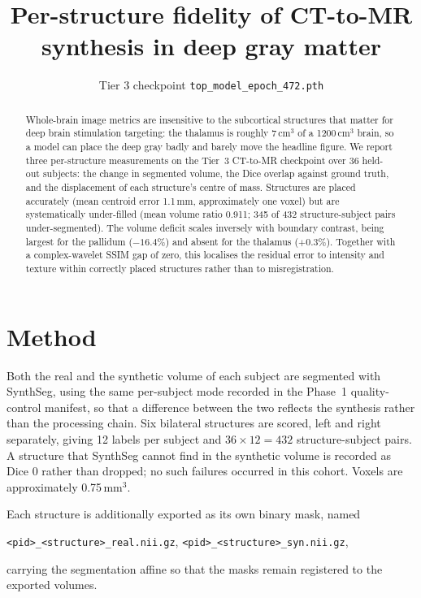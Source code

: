 \documentclass[11pt]{article}
\title{Per-structure fidelity of CT-to-MR synthesis in deep gray matter}
\author{Tier 3 checkpoint \texttt{top\_model\_epoch\_472.pth}}
\date{}
\begin{document}
\maketitle

\begin{abstract}
\noindent
Whole-brain image metrics are insensitive to the subcortical structures that
matter for deep brain stimulation targeting: the thalamus is roughly
7\,cm$^3$ of a 1200\,cm$^3$ brain, so a model can place the deep gray badly and
barely move the headline figure. We report three per-structure measurements on
the Tier~3 CT-to-MR checkpoint over 36 held-out subjects: the change in
segmented volume, the Dice overlap against ground truth, and the displacement of
each structure's centre of mass. Structures are placed accurately (mean centroid
error 1.1\,mm, approximately one voxel) but are systematically under-filled
(mean volume ratio 0.911; 345 of 432 structure-subject pairs under-segmented).
The volume deficit scales inversely with boundary contrast, being largest for the
pallidum ($-16.4\%$) and absent for the thalamus ($+0.3\%$). Together with a
complex-wavelet SSIM gap of zero, this localises the residual error to intensity
and texture within correctly placed structures rather than to misregistration.
\end{abstract}

\section{Method}

Both the real and the synthetic volume of each subject are segmented with
SynthSeg, using the same per-subject mode recorded in the Phase~1 quality-control
manifest, so that a difference between the two reflects the synthesis rather than
the processing chain. Six bilateral structures are scored, left and right
separately, giving 12 labels per subject and $36\times12=432$ structure-subject
pairs. A structure that SynthSeg cannot find in the synthetic volume is recorded
as Dice $0$ rather than dropped; no such failures occurred in this cohort.
Voxels are approximately 0.75\,mm$^3$.

Each structure is additionally exported as its own binary mask, named
\begin{center}
  \texttt{<pid>\_<structure>\_real.nii.gz}, \quad
  \texttt{<pid>\_<structure>\_syn.nii.gz},
\end{center}
carrying the segmentation affine so that the masks remain registered to the
exported volumes.
\end{document}
